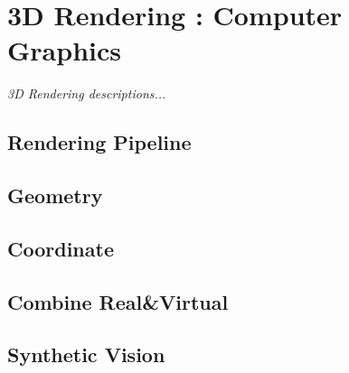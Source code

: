 \chapter{3D Rendering : Computer Graphics}\label{ch:3Drendering}
\begin{center}
{\small\em 3D Rendering descriptions...}
\end{center}

\section{Rendering Pipeline}

\section{Geometry}

\section{Coordinate}

\section{Combine Real\&Virtual}

\section{Synthetic Vision}

\newpage
